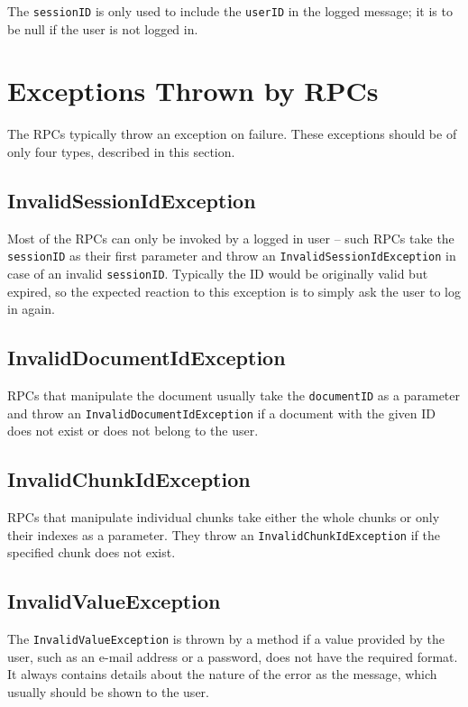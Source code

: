 {The {\tt sessionID} is only used to include the {\tt userID} in the logged message; it is to be null if the user is not logged in.

\section{Exceptions Thrown by RPCs}
\label{sec:rpc:exceptions}

The RPCs typically throw an exception on failure. These exceptions should be of only four types, described in this section.

\subsection{InvalidSessionIdException}

Most of the RPCs can only be invoked by a logged in user -- such RPCs take the {\tt sessionID} as their first parameter and throw an {\tt InvalidSessionIdException} in case of an invalid {\tt sessionID}. Typically the ID would be originally valid but expired, so the expected reaction to this exception is to simply ask the user to log in again.

\subsection{InvalidDocumentIdException}

RPCs that manipulate the document usually take the {\tt documentID} as a parameter and throw an {\tt InvalidDocumentIdException} if a document with the given ID does not exist or does not belong to the user.

\subsection{InvalidChunkIdException}

RPCs that manipulate individual chunks take either the whole chunks or only their indexes as a parameter. They throw an {\tt InvalidChunkIdException} if the specified chunk does not exist.

\subsection{InvalidValueException}

The {\tt InvalidValueException} is thrown by a method if a value provided by the user, such as an e-mail address or a password, does not have the required format. It always contains details about the nature of the error as the message, which usually should be shown to the user.


}
